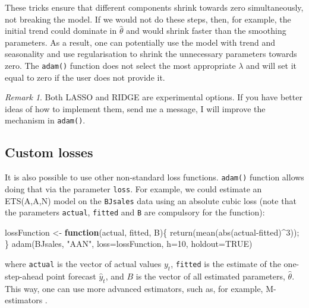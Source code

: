 \documentclass[
]{book}
\newenvironment{Shaded}{\begin{snugshade}}{\end{snugshade}}
\newcommand{\AttributeTok}[1]{\textcolor[rgb]{0.77,0.63,0.00}{#1}}
\newcommand{\ConstantTok}[1]{\textcolor[rgb]{0.00,0.00,0.00}{#1}}
\newcommand{\ControlFlowTok}[1]{\textcolor[rgb]{0.13,0.29,0.53}{\textbf{#1}}}
\newcommand{\DecValTok}[1]{\textcolor[rgb]{0.00,0.00,0.81}{#1}}
\newcommand{\FunctionTok}[1]{\textcolor[rgb]{0.00,0.00,0.00}{#1}}
\newcommand{\NormalTok}[1]{#1}
\newcommand{\OtherTok}[1]{\textcolor[rgb]{0.56,0.35,0.01}{#1}}
\newcommand{\SpecialCharTok}[1]{\textcolor[rgb]{0.00,0.00,0.00}{#1}}
\newcommand{\StringTok}[1]{\textcolor[rgb]{0.31,0.60,0.02}{#1}}
\theoremstyle{definition}
\theoremstyle{definition}
\theoremstyle{definition}
\theoremstyle{definition}
\theoremstyle{remark}
\newtheorem*{remark}{Remark}
\begin{document}
These tricks ensure that different components shrink towards zero simultaneously, not breaking the model. If we would not do these steps, then, for example, the initial trend could dominate in \(\hat{\theta}\) and would shrink faster than the smoothing parameters. As a result, one can potentially use the model with trend and seasonality and use regularisation to shrink the unnecessary parameters towards zero. The \texttt{adam()} function does not select the most appropriate \(\lambda\) and will set it equal to zero if the user does not provide it.

\begin{remark}
Both LASSO and RIDGE are experimental options. If you have better ideas of how to implement them, send me a message, I will improve the mechanism in \texttt{adam()}.
\end{remark}

\hypertarget{custom-losses}{%
\subsection{Custom losses}\label{custom-losses}}

It is also possible to use other non-standard loss functions. \texttt{adam()} function allows doing that via the parameter \texttt{loss}. For example, we could estimate an ETS(A,A,N) model on the \texttt{BJsales} data using an absolute cubic loss (note that the parameters \texttt{actual}, \texttt{fitted} and \texttt{B} are compulsory for the function):

\begin{Shaded}
\begin{Highlighting}[]
\NormalTok{lossFunction }\OtherTok{\textless{}{-}} \ControlFlowTok{function}\NormalTok{(actual, fitted, B)\{}
    \FunctionTok{return}\NormalTok{(}\FunctionTok{mean}\NormalTok{(}\FunctionTok{abs}\NormalTok{(actual}\SpecialCharTok{{-}}\NormalTok{fitted)}\SpecialCharTok{\^{}}\DecValTok{3}\NormalTok{));}
\NormalTok{\}}
\FunctionTok{adam}\NormalTok{(BJsales, }\StringTok{"AAN"}\NormalTok{, }\AttributeTok{loss=}\NormalTok{lossFunction, }\AttributeTok{h=}\DecValTok{10}\NormalTok{, }\AttributeTok{holdout=}\ConstantTok{TRUE}\NormalTok{)}
\end{Highlighting}
\end{Shaded}

where \texttt{actual} is the vector of actual values \(y_t\), \texttt{fitted} is the estimate of the one-step-ahead point forecast \(\hat{y}_t\), and \(B\) is the vector of all estimated parameters, \(\hat{\theta}\). This way, one can use more advanced estimators, such as, for example, M-estimators \citep{Barrow2020}.
\end{document}
